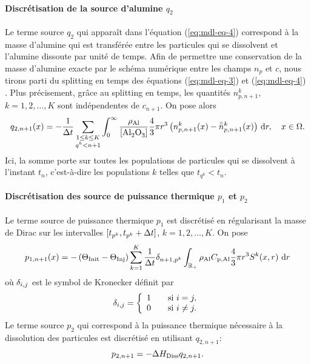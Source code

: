 \paragraph{Discrétisation de la source d'alumine $q_{2}$}
Le terme source $q_{2}$ qui apparaît dans l'équation
(\ref{eq:mdl-eq-4}) correspond à la masse d'alumine qui est transférée
entre les particules qui se dissolvent et l'alumine dissoute par unité
de temps. Afin de permettre une conservation de la masse d'alumine
exacte par le schéma numérique entre les champs $n_p$ et $c$, nous
tirons parti du splitting en temps des équations (\ref{eq:mdl-eq-3})
et (\ref{eq:mdl-eq-4}) \cite{Hofer2011}. Plus précisement, grâce au
splitting en temps, les quantités $n_{p,n+1}^k$, $k = 1, 2, \dots, K$
sont indépendentes de $c_{n+1}$. On pose alors
\begin{equation}\label{eq:q2}
  q_{2,n+1}(x) = -\frac{1}{\dt} \sum_{\substack{1\leq k\leq K\\ q^k < n+1}}
  \int_{0}^\infty
  \frac{\aluminadensity}{[\ce{Al2O3}]} \frac{4}{3}\pi r^3
  \parent{n_{p,n+1}^k(x) - \bar{\bar n}_{p,n+1}^k(x)} \intd{r}, \quad x\in\Omega.
\end{equation}
Ici, la somme porte sur toutes les populations de particules qui se
dissolvent à l'instant $t_n$, c'est-à-dire les populations $k$
telles que $t_{q^k} < t_n$.


\paragraph{Discrétisation des source de puissance thermique $p_1$ et
$p_2$} Le terme source de puissance thermique $p_1$ est discrétisé
en régularisant la masse de Dirac sur les intervalles $[t_{p^k},
  t_{p^k} + \Delta t]$, $k = 1, 2, \dots, K$. On pose
\begin{equation}\label{eq:p1-discret}
p_{1,n+1}(x) = -\left( \Theta_\text{Init} - \Theta_\text{Inj} \right)\sum_{k = 1}^K
\frac{1}{\Delta t}\delta_{n+1,p^k}\int_{\mathbb R_+} \rho_\mathrm{Al}C_{\mathrm{p,Al}}
\frac{4}{3}\pi r^3S^k(x, r)\,\,\mathrm dr
\end{equation}
où $\delta_{i,j}$ est le symbol de Kronecker définit par
\begin{equation}
  \delta_{i,j} = \left\{
  \begin{array}{ll}
    1&\quad\text{si } i = j,\\
    0&\quad\text{si } i\neq j.
  \end{array}\right.
\end{equation}
Le terme source $p_2$ qui correspond à la puissance thermique
nécessaire à la dissolution des particules est discrétisé en
utilisant $q_{2,n+1}$:
\begin{equation}\label{eq:p2-discret}
p_{2,n+1} = -\Delta H_\text{Diss} q_{2,n+1}.
\end{equation}

